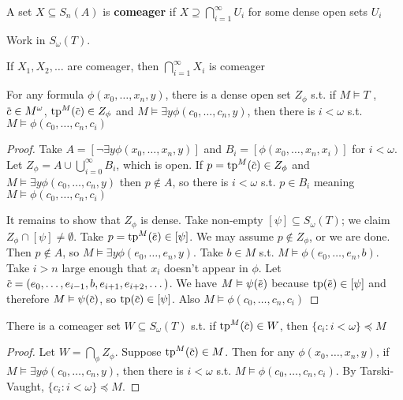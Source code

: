 \documentclass[11pt]{article}
\begin{document}
\begin{definition}[]
A set \(X\subseteq S_n(A)\) is \textbf{comeager} if \(X\supseteq\bigcap_{i=1}^\infty U_i\) for some dense open sets \(U_i\)
\end{definition}
Work in \(S_\omega(T)\).

\begin{lemma}[]
If \(X_1,X_2,\dots\) are comeager, then \(\bigcap_{i=1}^\infty X_i\) is comeager
\end{lemma}

\begin{lemma}[]
For any formula \(\phi(x_0,\dots,x_n,y)\), there is a dense open set \(Z_\phi\) s.t. if \(M\vDash T\)
, \(\barc\in M^\omega\), \(\tp^M(\barc)\in Z_\phi\) and \(M\vDash\exists y\phi(c_0,\dots,c_n,y)\), then there is \(i<\omega\)
s.t. \(M\vDash\phi(c_0,\dots,c_n,c_i)\)
\end{lemma}

\begin{proof}
Take \(A=[\neg\exists y\phi(x_0,\dots,x_n,y)]\) and \(B_i=[\phi(x_0,\dots,x_n,x_i)]\) for \(i<\omega\).
Let \(Z_\phi=A\cup\bigcup_{i=0}^\infty B_i\), which is open. If \(p=\tp^M(\barc)\in Z_\phi\) and \(M\vDash\exists y\phi(c_0,\dots,c_n,y)\)
then \(p\notin A\), so there is \(i<\omega\) s.t. \(p\in B_i\) meaning \(M\vDash\phi(c_0,\dots,c_n,c_i)\)

It remains to show that \(Z_\phi\) is dense. Take non-empty \([\psi]\subseteq S_\omega(T)\); we claim \(Z_\phi\cap[\psi]\neq\emptyset\).
Take \(p=\tp^M(\bare)\in[\psi]\). We may assume \(p\notin Z_\phi\), or we are done. Then \(p\notin A\),
so \(M\vDash\exists y\phi(e_0,\dots,e_n,y)\). Take \(b\in M\) s.t. \(M\vDash\phi(e_0,\dots,e_n,b)\). Take \(i>n\) large enough
that \(x_i\) doesn't appear in \(\phi\).
Let \(\barc=(e_0,\dots,e_{i-1},b,e_{i+1},e_{i+2},\dots)\). We have \(M\vDash\psi(\bare)\)
because \(\tp(\bare)\in[\psi]\) and therefore \(M\vDash\psi(\barc)\), so \(\tp(\barc)\in[\psi]\). Also \(M\vDash\phi(c_0,\dots,c_n,c_i)\)
\end{proof}

\begin{proposition}[]
There is a comeager set \(W\subseteq S_\omega(T)\) s.t. if \(\tp^M(\barc)\in W\), then \(\{c_i:i<\omega\}\preceq M\)
\end{proposition}

\begin{proof}
Let \(W=\bigcap_\phi Z_\phi\). Suppose \(\tp^M(\barc)\in M\). Then for any \(\phi(x_0,\dots,x_n,y)\),
if \(M\vDash\exists y\phi(c_0,\dots,c_n,y)\), then there is \(i<\omega\) s.t. \(M\vDash\phi(c_0,\dots,c_n,c_i)\). By
Tarski-Vaught, \(\{c_i:i<\omega\}\preceq M\).
\end{proof}
\end{document}
